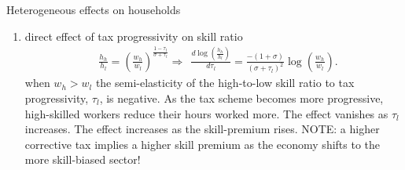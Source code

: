 \documentclass[11pt,aspectratio=169]{beamer}
\begin{document}
\begin{frame}{Heterogeneous effects on households}
	\begin{enumerate}
		\item direct effect of tax progressivity on skill ratio\begin{align*}
		&\frac{h_h}{h_l}=\left(\frac{w_h}{w_l}\right)^\frac{1-\tau_l}{\sigma+\tau_l}
		\Rightarrow\ \  \frac{d\log(\frac{h_h}{h_l})}{d \tau_l}
		= \frac{-(1+\sigma)}{(\sigma+\tau_l)^2}\log\left(\frac{w_h}{w_l}\right).
		\end{align*}
		when $w_h>w_l$ the semi-elasticity of the high-to-low skill ratio to tax progressivity, $\tau_l$, is negative. As the tax scheme becomes more progressive, high-skilled workers reduce their hours worked more. The effect vanishes as $\tau_l$ increases. The effect increases as the skill-premium rises. NOTE: a higher corrective tax implies a higher skill premium as the economy shifts to the more skill-biased sector!
	\end{enumerate}
\end{frame}
\end{document}

